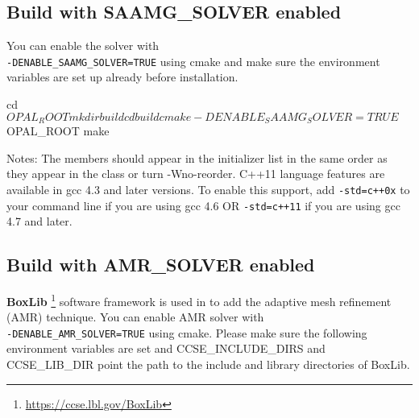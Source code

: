 \begin{footnotesize}
\end{footnotesize}

\subsection{Build \opal with SAAMG\_SOLVER enabled}
You can enable the solver with\\ \texttt{-DENABLE\_SAAMG\_SOLVER=TRUE} using cmake
and make sure the environment variables 
are set up already before {\opal} installation.

\begin{footnotesize}
\begin{example}
cd $OPAL_ROOT
mkdir build
cd build
cmake -DENABLE_SAAMG_SOLVER=TRUE $OPAL_ROOT
make
\end{example}
\end{footnotesize}

Notes:
The members should appear in the initializer list in the same order as they
appear in the class or turn -Wno-reorder.
C++11 language features are available in gcc 4.3 and later versions. To enable
this support, add \texttt{-std=c++0x} to your command line if you are using gcc 4.6
OR \texttt{-std=c++11} if you are using gcc 4.7 and later.

\subsection{Build \opal with AMR\_SOLVER enabled}
{\bf BoxLib} \footnote{\url{https://ccse.lbl.gov/BoxLib}} software framework is used in \opal  to add the adaptive mesh refinement (AMR) technique.
You can enable AMR solver with\\ \texttt{-DENABLE\_AMR\_SOLVER=TRUE} using cmake. Please make sure the following
environment variables are set and CCSE\_INCLUDE\_DIRS and CCSE\_LIB\_DIR point the path to the include and library directories
of BoxLib.

